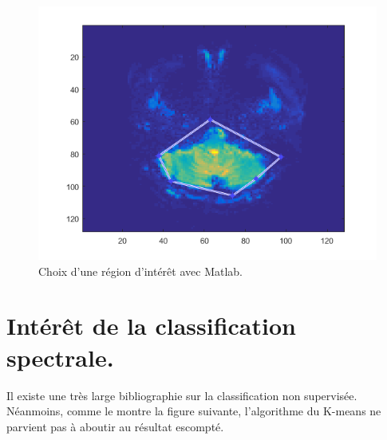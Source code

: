 \begin{figure}[H]
\centering
    \includegraphics[scale=0.8,angle=0]{Images/ExampleROI.png}
    \caption{Choix d'une région d'intérêt avec Matlab.}
    \label{fig:ExampleROI}
\end{figure}



\chapter{Intérêt de la classification spectrale.}

Il existe une très large bibliographie sur la classification non supervisée. Néanmoins, comme le montre la figure suivante, l'algorithme du K-means ne parvient pas à aboutir au résultat escompté. 

